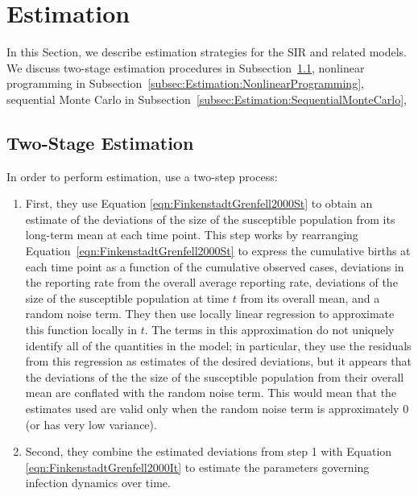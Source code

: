 \documentclass[fleqn]{article}\usepackage[]{graphicx}\usepackage[]{color}
\begin{document}

\section{Estimation}
\label{sec:Estimation}

In this Section, we describe estimation strategies for the SIR and related models.  We discuss two-stage estimation procedures in Subsection~\ref{subsec:Estimation:TwoStage}, nonlinear programming in Subsection~\ref{subsec:Estimation:NonlinearProgramming}, sequential Monte Carlo in Subsection~\ref{subsec:Estimation:SequentialMonteCarlo}, 

\subsection{Two-Stage Estimation}
\label{subsec:Estimation:TwoStage}

In order to perform estimation, \cite{finkenstadt2000TimeSeriesDiseasesDynamicalSystems} use a two-step process:
\begin{enumerate}
\item First, they use Equation \eqref{eqn:FinkenstadtGrenfell2000St} to obtain an estimate of the deviations of the size of the susceptible population from its long-term mean at each time point.  This step works by rearranging Equation~\eqref{eqn:FinkenstadtGrenfell2000St} to express the cumulative births at each time point as a function of the cumulative observed cases, deviations in the reporting rate from the overall average reporting rate, deviations of the size of the susceptible population at time $t$ from its overall mean, and a random noise term.  They then use locally linear regression to approximate this function locally in $t$.  The terms in this approximation do not uniquely identify all of the quantities in the model; in particular, they use the residuals from this regression as estimates of the desired deviations, but it appears that the deviations of the the size of the susceptible population from their overall mean are conflated with the random noise term.  This would mean that the estimates used are valid only when the random noise term is approximately $0$ (or has very low variance).
\item Second, they combine the estimated deviations from step 1 with Equation \eqref{eqn:FinkenstadtGrenfell2000It} to estimate the parameters governing infection dynamics over time.
\end{enumerate}
\end{document}
